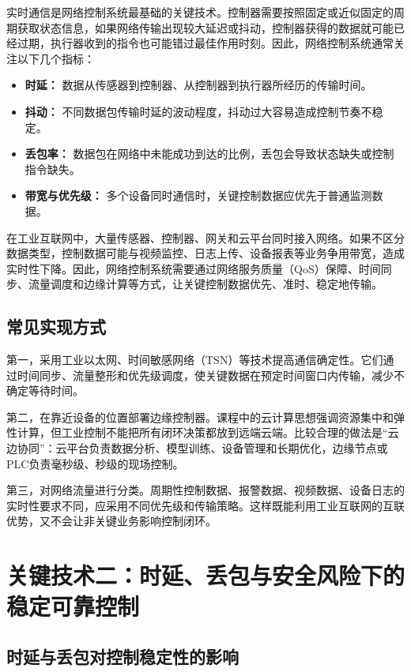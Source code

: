 \documentclass[UTF8,a4paper,zihao=-4]{ctexart}
\begin{document}
实时通信是网络控制系统最基础的关键技术。控制器需要按照固定或近似固定的周期获取状态信息，如果网络传输出现较大延迟或抖动，控制器获得的数据就可能已经过期，执行器收到的指令也可能错过最佳作用时刻。因此，网络控制系统通常关注以下几个指标：

\begin{itemize}
  \item \textbf{时延：} 数据从传感器到控制器、从控制器到执行器所经历的传输时间。
  \item \textbf{抖动：} 不同数据包传输时延的波动程度，抖动过大容易造成控制节奏不稳定。
  \item \textbf{丢包率：} 数据包在网络中未能成功到达的比例，丢包会导致状态缺失或控制指令缺失。
  \item \textbf{带宽与优先级：} 多个设备同时通信时，关键控制数据应优先于普通监测数据。
\end{itemize}

在工业互联网中，大量传感器、控制器、网关和云平台同时接入网络。如果不区分数据类型，控制数据可能与视频监控、日志上传、设备报表等业务争用带宽，造成实时性下降。因此，网络控制系统需要通过网络服务质量（QoS）保障、时间同步、流量调度和边缘计算等方式，让关键控制数据优先、准时、稳定地传输。

\subsection{常见实现方式}

第一，采用工业以太网、时间敏感网络（TSN）等技术提高通信确定性。它们通过时间同步、流量整形和优先级调度，使关键数据在预定时间窗口内传输，减少不确定等待时间。

第二，在靠近设备的位置部署边缘控制器。课程中的云计算思想强调资源集中和弹性计算，但工业控制不能把所有闭环决策都放到远端云端。比较合理的做法是“云边协同”：云平台负责数据分析、模型训练、设备管理和长期优化，边缘节点或PLC负责毫秒级、秒级的现场控制。

第三，对网络流量进行分类。周期性控制数据、报警数据、视频数据、设备日志的实时性要求不同，应采用不同优先级和传输策略。这样既能利用工业互联网的互联优势，又不会让非关键业务影响控制闭环。

\section{关键技术二：时延、丢包与安全风险下的稳定可靠控制}

\subsection{时延与丢包对控制稳定性的影响}
\end{document}
